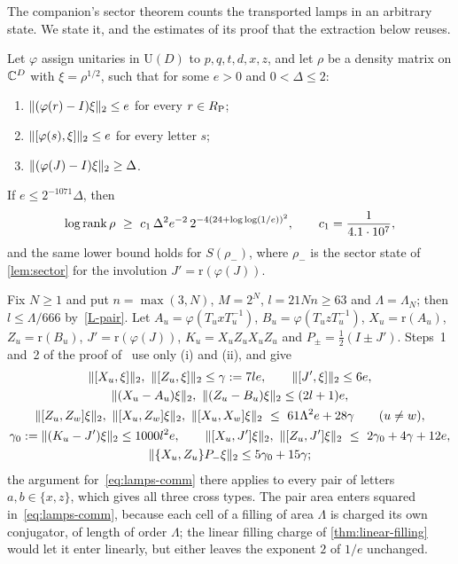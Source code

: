The companion's sector theorem counts the transported lamps in an arbitrary state. We state it, and the estimates of its proof
that the extraction below reuses.

\begin{theorem}\label{thm:lamps-sector}
Let $\varphi$ assign unitaries in $\mathrm U(D)$ to $p,q,t,d,x,z$, and let $\rho$ be a density matrix on $\mathbb C^D$ with
$\xi=\rho^{1/2}$, such that for some $e>0$ and $0<\Delta\le2$:
\begin{enumerate}[label=(\roman*),itemsep=1pt]
\item $\lVert (\varphi(r)-I)\xi\rVert_2\le e$ for every $r\in R_{\mathrm P}$;
\item $\lVert [\varphi(s),\xi]\rVert_2\le e$ for every letter $s$;
\item $\lVert (\varphi(J)-I)\xi\rVert_2\ge\Delta$.
\end{enumerate}
If $e\le2^{-1071}\Delta$, then
\[
\log\rank\rho\ \ge\ c_1\,\Delta^2e^{-2}\,2^{-4(24+\log\log(1/e))^2},\qquad c_1=\frac1{4.1\cdot10^7},
\]
and the same lower bound holds for $S(\rho_-)$, where $\rho_-$ is the sector state of \cref{lem:sector} for the involution
$J'=\mathrm r(\varphi(J))$.
\end{theorem}

Fix $N\ge1$ and put $n=\max(3,N)$, $M=2^N$, $l=21Nn\ge63$ and $\Lambda=\Lambda_N$; then $l\le\Lambda/666$ by~\ref{L-pair}. Let
$A_u=\varphi(T_uxT_u^{-1})$, $B_u=\varphi(T_uzT_u^{-1})$, $X_u=\mathrm r(A_u)$, $Z_u=\mathrm r(B_u)$, $J'=\mathrm r(\varphi(J))$,
$K_u=X_uZ_uX_uZ_u$ and $P_\pm=\frac12(I\pm J')$. Steps~1 and~2 of the proof of~\cite[Theorem~8.1]{DM-game} use only (i) and (ii),
and give
\begin{gather}
\hs{[X_u,\xi]},\ \hs{[Z_u,\xi]}\le\gamma:=7le,\qquad\hs{[J',\xi]}\le6e,\notag\\
\hs{(X_u-A_u)\xi},\ \hs{(Z_u-B_u)\xi}\le(2l+1)e,\notag\\
\hs{[Z_u,Z_w]\xi},\ \hs{[X_u,Z_w]\xi},\ \hs{[X_u,X_w]\xi}\ \le\ 61\Lambda^2e+28\gamma\qquad(u\ne w),\label{eq:lamps-comm}\\
\gamma_0:=\hs{(K_u-J')\xi}\le1000l^2e,\qquad\hs{[X_u,J']\xi},\ \hs{[Z_u,J']\xi}\ \le\ 2\gamma_0+4\gamma+12e,\label{eq:lamps-J}\\
\hs{\{X_u,Z_u\}P_-\xi}\le5\gamma_0+15\gamma;\label{eq:lamps-anti}
\end{gather}
the argument for~\eqref{eq:lamps-comm} there applies to every pair of letters $a,b\in\{x,z\}$, which gives all three cross
types. The pair area enters squared in~\eqref{eq:lamps-comm}, because each cell of a filling of area $\Lambda$ is charged its own
conjugator, of length of order $\Lambda$; the linear filling charge of \cref{thm:linear-filling} would let it enter linearly, but
either leaves the exponent $2$ of $1/e$ unchanged.

